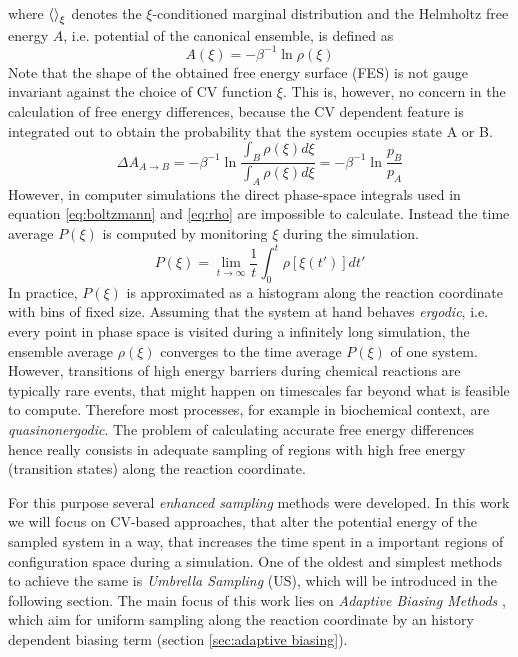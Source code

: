 where $\braket{}_\xi$ denotes the $\xi$-conditioned marginal distribution and the Helmholtz free energy $A$, i.e. potential of the canonical ensemble, is defined as
\begin{equation}
  A(\xi) = -\beta^{-1}\ln \rho(\xi)
  \label{eq:free energy}
\end{equation}
Note that the shape of the obtained free energy surface (FES) is not gauge invariant against the choice of CV function $\xi$. This is, however, no concern in the calculation of free energy differences, because the CV dependent feature is integrated out to obtain the probability that the system occupies state A or B.\autocite{bal2020free}
\begin{equation}
  \Delta A_{A\rightarrow B} = -\beta^{-1}\ln \frac{\int_B \rho(\xi)d\xi}{\int_A \rho(\xi)d\xi}=-\beta^{-1}\ln \frac{p_B}{p_A}
  \label{eq:free energy diff}
\end{equation}
However, in computer simulations the direct phase-space integrals used in equation \ref{eq:boltzmann} and \ref{eq:rho} are impossible to calculate.\autocite{chipot2007free} Instead the time average $P(\xi)$ is computed by monitoring $\xi$ during the simulation.
\begin{equation}
  P(\xi)=\lim_{t\rightarrow \infty}\frac{1}{t} \int_0^t \rho[\xi (t')] dt'
  \label{eq:ergodic}
\end{equation}
In practice, $P(\xi)$ is approximated as a histogram along the reaction coordinate with bins of fixed size.
Assuming that the system at hand behaves \textit{ergodic}, i.e. every point in phase space is visited during a infinitely long simulation, the ensemble average $\rho(\xi)$ converges to the time average $P(\xi)$ of one system.
However, transitions of high energy barriers during chemical reactions are typically rare events, that might happen on timescales far beyond what is feasible to compute. Therefore most processes, for example in biochemical context, are \textit{quasinonergodic}.
The problem of calculating accurate free energy differences hence really consists in adequate sampling of regions with high free energy (transition states) along the reaction coordinate.

For this purpose several \textit{enhanced sampling} methods were developed.\autocite{jiang2010free, sugita1999replica,den2000thermodynamic, kastner2011umbrella, ciccotti2005blue, barducci2008well}
In this work we will focus on CV-based approaches, that alter the potential energy of the sampled system in a way, that increases the time spent in a important regions of configuration space during a simulation. One of the oldest and simplest methods to achieve the same is \textit{Umbrella Sampling} (US)\autocite{kastner2011umbrella}, which will be introduced in the following section.
The main focus of this work lies on \textit{Adaptive Biasing Methods} \autocite{barducci2011metadynamics,comer2015adaptive, lesage2017smoothed}, which aim for uniform sampling along the reaction coordinate by an history dependent biasing term (section \ref{sec:adaptive biasing}).
\newpage

